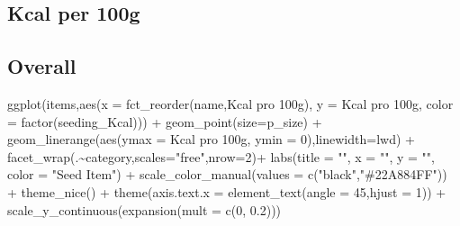 \documentclass[
  letterpaper,
  DIV=11,
  numbers=noendperiod]{scrartcl}
\newenvironment{Shaded}{\begin{snugshade}}{\end{snugshade}}
\newcommand{\AttributeTok}[1]{\textcolor[rgb]{0.40,0.45,0.13}{#1}}
\newcommand{\DecValTok}[1]{\textcolor[rgb]{0.68,0.00,0.00}{#1}}
\newcommand{\FloatTok}[1]{\textcolor[rgb]{0.68,0.00,0.00}{#1}}
\newcommand{\FunctionTok}[1]{\textcolor[rgb]{0.28,0.35,0.67}{#1}}
\newcommand{\NormalTok}[1]{\textcolor[rgb]{0.00,0.23,0.31}{#1}}
\newcommand{\SpecialCharTok}[1]{\textcolor[rgb]{0.37,0.37,0.37}{#1}}
\newcommand{\StringTok}[1]{\textcolor[rgb]{0.13,0.47,0.30}{#1}}
\begin{document}
\subsection{Kcal per 100g}\label{kcal-per-100g}

\subsection{Overall}

\begin{Shaded}
\begin{Highlighting}[]
\FunctionTok{ggplot}\NormalTok{(items,}\FunctionTok{aes}\NormalTok{(}\AttributeTok{x =} \FunctionTok{fct\_reorder}\NormalTok{(name,}\StringTok{\textasciigrave{}}\AttributeTok{Kcal pro 100g}\StringTok{\textasciigrave{}}\NormalTok{),}
                 \AttributeTok{y =} \StringTok{\textasciigrave{}}\AttributeTok{Kcal pro 100g}\StringTok{\textasciigrave{}}\NormalTok{,}
                 \AttributeTok{color =} \FunctionTok{factor}\NormalTok{(seeding\_Kcal))) }\SpecialCharTok{+}
  \FunctionTok{geom\_point}\NormalTok{(}\AttributeTok{size=}\NormalTok{p\_size) }\SpecialCharTok{+}
  \FunctionTok{geom\_linerange}\NormalTok{(}\FunctionTok{aes}\NormalTok{(}\AttributeTok{ymax =} \StringTok{\textasciigrave{}}\AttributeTok{Kcal pro 100g}\StringTok{\textasciigrave{}}\NormalTok{, }\AttributeTok{ymin =} \DecValTok{0}\NormalTok{),}\AttributeTok{linewidth=}\NormalTok{lwd) }\SpecialCharTok{+}
  \FunctionTok{facet\_wrap}\NormalTok{(.}\SpecialCharTok{\textasciitilde{}}\NormalTok{category,}\AttributeTok{scales=}\StringTok{"free"}\NormalTok{,}\AttributeTok{nrow=}\DecValTok{2}\NormalTok{)}\SpecialCharTok{+}
  \FunctionTok{labs}\NormalTok{(}\AttributeTok{title =} \StringTok{""}\NormalTok{,}
       \AttributeTok{x     =} \StringTok{""}\NormalTok{,}
       \AttributeTok{y     =} \StringTok{""}\NormalTok{,}
       \AttributeTok{color =} \StringTok{"Seed Item"}\NormalTok{) }\SpecialCharTok{+}
  \FunctionTok{scale\_color\_manual}\NormalTok{(}\AttributeTok{values =} \FunctionTok{c}\NormalTok{(}\StringTok{"black"}\NormalTok{,}\StringTok{"\#22A884FF"}\NormalTok{)) }\SpecialCharTok{+}
  \FunctionTok{theme\_nice}\NormalTok{() }\SpecialCharTok{+}
  \FunctionTok{theme}\NormalTok{(}\AttributeTok{axis.text.x =} \FunctionTok{element\_text}\NormalTok{(}\AttributeTok{angle =} \DecValTok{45}\NormalTok{,}\AttributeTok{hjust =} \DecValTok{1}\NormalTok{)) }\SpecialCharTok{+}
  \FunctionTok{scale\_y\_continuous}\NormalTok{(}\FunctionTok{expansion}\NormalTok{(}\AttributeTok{mult =} \FunctionTok{c}\NormalTok{(}\DecValTok{0}\NormalTok{, }\FloatTok{0.2}\NormalTok{)))}
\end{Highlighting}
\end{Shaded}
\end{document}
